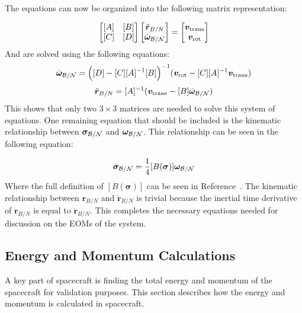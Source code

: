 The equations can now be organized into the following matrix representation:

\begin{equation}
\begin{bmatrix}
[A] & [B]\\
[C] & [D]
\end{bmatrix} \begin{bmatrix}
\ddot{\bm r}_{B/N}\\
\dot{\bm\omega}_{\cal B/N}
\end{bmatrix} = \begin{bmatrix}
\bm v_{\text{trans}}\\
\bm v_{\text{rot}}
\end{bmatrix}
\label{eq:backSub}
\end{equation}
And are solved using the following equations:
\begin{equation}
\dot{\bm\omega}_{\cal B/N} = \Big([D] - [C][A]^{-1}[B]\Big)^{-1}(\bm v_{\text{rot}} - [C][A]^{-1}\bm v_{\text{trans}})
\end{equation}
\begin{equation}
\ddot{\bm r}_{B/N} = [A]^{-1} (\bm v_{\text{trans}} - [B]\dot{\bm\omega}_{\cal B/N})
\end{equation}
This shows that only two $3\times 3$ matrices are needed to solve this system of equations. One remaining equation that should be included is the kinematic relationship between $\bm \sigma_{\cal{B}/\cal{N}}$ and $\bm \omega_{\cal{B}/\cal{N}}$. This relationship can be seen in the following equation:

\begin{equation}
\dot{\bm \sigma}_{\cal{B}/\cal{N}} = \frac{1}{4} [B(\bm \sigma)]\bm \omega_{\cal{B}/\cal{N}}
\end{equation}
Where the full definition of $[B(\bm \sigma)]$ can be seen in Reference~\cite{schaub}. The kinematic relationship between $\bm r_{B/N}$ and $\dot{\bm r}_{B/N}$ is trivial because the inertial time derivative of $\bm r_{B/N}$ is equal to $\dot{\bm r}_{B/N}$. This completes the necessary equations needed for discussion on the EOMs of the system.

\subsection{Energy and Momentum Calculations}

A key part of spacecraft is finding the total energy and momentum of the spacecraft for validation purposes. This section describes how the energy and momentum is calculated in spacecraft.

